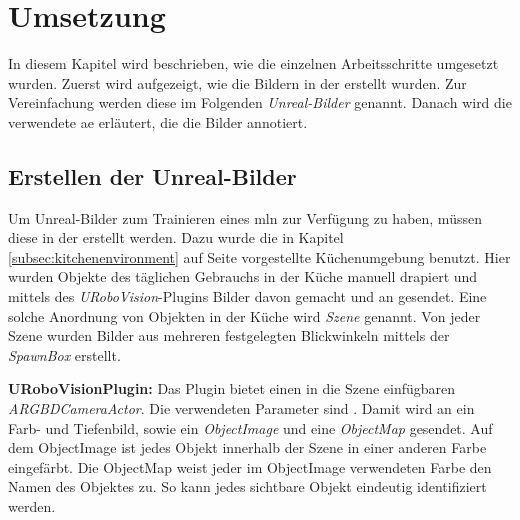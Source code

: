 \graphicspath{{./images/}}      
\def\CHAPTERONE{./chapters/Chapter-1} 

\chapter{Umsetzung}
\label{chap:implementation}
%	

In diesem Kapitel wird beschrieben, wie die einzelnen Arbeitsschritte umgesetzt wurden. Zuerst wird aufgezeigt, wie die Bildern in der \unreal erstellt wurden. Zur Vereinfachung werden diese  im Folgenden \textit{Unreal-Bilder} genannt. Danach wird die verwendete \gls{ae} erläutert, die die Bilder annotiert. 

\section{Erstellen der Unreal-Bilder}
\label{sec:takingpics}
Um Unreal-Bilder zum Trainieren eines \gls{mln} zur Verfügung zu haben, müssen diese in der \unreal erstellt werden. Dazu wurde die in Kapitel \ref{subsec:kitchenenvironment} auf Seite \pageref{subsec:kitchenenvironment} vorgestellte Küchenumgebung benutzt. Hier wurden Objekte des täglichen Gebrauchs in der Küche manuell drapiert und mittels des \textit{URoboVision}-Plugins Bilder davon gemacht und an \robosherlock gesendet. Eine solche Anordnung von Objekten in der Küche wird \textit{Szene} genannt. Von jeder Szene wurden Bilder aus mehreren festgelegten Blickwinkeln mittels der \textit{SpawnBox} erstellt. \par 

\textbf{URoboVisionPlugin:} Das Plugin bietet einen in die Szene einfügbaren \textit{ARGBDCameraActor}. Die verwendeten Parameter sind . Damit wird an \robosherlock ein Farb- und Tiefenbild, sowie ein \textit{ObjectImage} und eine \textit{ObjectMap} gesendet. Auf dem ObjectImage ist jedes Objekt innerhalb der Szene in einer anderen Farbe eingefärbt. Die ObjectMap weist jeder im ObjectImage verwendeten Farbe den Namen des Objektes zu. So kann jedes sichtbare Objekt eindeutig identifiziert werden.   \par 


